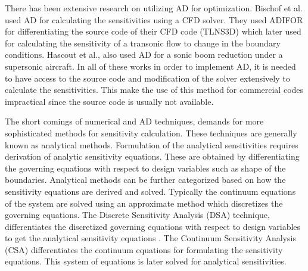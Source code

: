 There has been extensive research on utilizing AD for optimization. Bischof et al. used AD for calculating the sensitivities using a CFD solver. They used ADIFOR for differentiating the source code of their CFD code (TLNS3D) which later used for calculating the sensitivity of a transonic flow to change in the boundary conditions. Hascout et al., also used AD for a sonic boom reduction under a supersonic aircraft. In all of these works in order to implement AD, it is needed to have access to the source code and modification of the solver extensively to calculate the sensitivities. This make the use of this method for commercial codes impractical since the source code is usually not available.

The short comings of numerical and AD techniques, demands for more sophisticated methods for sensitivity calculation. These techniques are generally known as analytical methods. Formulation of the analytical sensitivities requires derivation of analytic sensitivity equations. These are obtained by differentiating the governing equations with respect to design variables such as shape of the boundaries. Analytical methods can be further categorized based on how the sensitivity equations are derived and solved. Typically the continuum equations of the system are solved using an approximate method which discretizes the governing equations. The Discrete Sensitivity Analysis (DSA) technique, differentiates the discretized governing equations with respect to design variables to get the analytical sensitivity equations \cite{choi2006structural}. The Continuum Sensitivity Analysis (CSA) differentiates the continuum equations for formulating the sensitivity equations. This system of equations is later solved for analytical sensitivities.  

